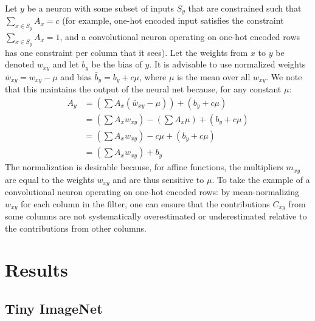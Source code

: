 \documentclass{article}
\begin{document}
Let $y$ be a neuron with some subset of inputs $S_y$ that are constrained such that $\sum_{x \in S_y} A_x=c$ (for example, one-hot encoded input satisfies the constraint $\sum_{x \in S_y} A_x = 1$, and a convolutional neuron operating on one-hot encoded rows has one constraint per column that it sees). Let the weights from $x$ to $y$ be denoted $w_{xy}$ and let $b_y$ be the bias of $y$. It is advisable to use normalized weights $\bar{w}_{xy} = w_{xy} - \mu$ and bias $\bar{b}_y = b_y + c\mu$, where $\mu$ is the mean over all $w_{xy}$. We note that this maintains the output of the neural net because, for any constant $\mu$:
\begin{equation}
\begin{aligned}
A_y &= \left(\sum A_x (\bar{w}_{xy} - \mu) \right) + (b_y + c\mu)\\
	&= \left(\sum A_x w_{xy}\right) - \left(\sum A_x \mu\right) + (b_y + c\mu)\\
    &= \left(\sum A_x w_{xy}\right) - c\mu + (b_y + c\mu)\\
    &= \left(\sum A_x w_{xy}\right) + b_y
\end{aligned}
\end{equation}
The normalization is desirable because, for affine functions, the multipliers $m_{xy}$ are equal to the weights $w_{xy}$ and are thus sensitive to $\mu$. To take the example of a convolutional neuron operating on one-hot encoded rows: by mean-normalizing $w_{xy}$ for each column in the filter, one can ensure that the contributions $C_{xy}$ from some columns are not systematically overestimated or underestimated relative to the contributions from other columns.

\vspace{-10px}
\section{Results}

\subsection{Tiny ImageNet}
\end{document}
